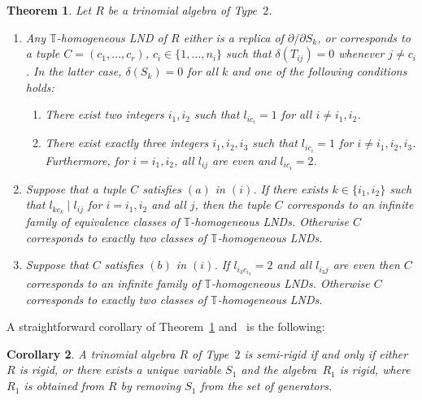 \documentclass[a4paper,reqno,12pt]{amsart}
\theoremstyle{plain}
\newtheorem{theorem}{Theorem}[section]
\newtheorem{corollary}[theorem]{Corollary}
\theoremstyle{definition}
\theoremstyle{plain}
\theoremstyle{remark}
\newcommand{\TT}{\mathbb{T}}
\begin{document}
\begin{theorem}\label{TheoremType2Classes}
    Let $R$ be a trinomial algebra of Type~$2$. 
    \begin{enumerate}
        \item [$(i)$] Any ${\TT}$-homogeneous LND of $R$ either is a replica of ${\partial/\partial S_k}$, or corresponds to a tuple $C=(c_1,\ldots,c_r)$, $c_i\in\{1,\ldots,n_i\}$ such that $\delta(T_{ij})=0$ whenever $j\neq c_i$. In the latter case, $\delta(S_k)=0$ for all $k$ and one of the following conditions holds:
        \begin{enumerate}
            \item [$(a)$] There exist two integers $i_1,i_2$ such that $l_{ic_i}=1$ for all $i\neq i_1, i_2$.
            \item [$(b)$] There exist exactly three integers $i_1, i_2, i_3$ such that $l_{ic_i}=1$ for $i\neq i_1, i_2, i_3$. Furthermore, for $i=i_1,i_2$, all $l_{ij}$ are even and $l_{ic_i}=2$.
        \end{enumerate}
        \item [$(ii)$] Suppose that a tuple $C$ satisfies $(a)$ in $(i)$. If there exists $k\in\{i_1, i_2\}$ such that $l_{kc_k}\mid l_{ij}$ for  $i=i_1, i_2$ and all $j$, then the tuple $C$ corresponds to an infinite family of equivalence classes of ${\TT}$-homogeneous LNDs. Otherwise $C$ corresponds to exactly two classes of ${\TT}$-homogeneous LNDs.
        \item [$(iii)$] Suppose that $C$ satisfies \emph{$(b)$} in \emph{$(i)$}. If $l_{i_3 c_{i_3}}=2$ and all $l_{i_3 j}$ are even then $C$ corresponds to an infinite family of ${\TT}$-homogeneous LNDs. Otherwise $C$ corresponds to exactly two classes of ${\TT}$-homogeneous LNDs.
    \end{enumerate}
\end{theorem}

A straightforward corollary of Theorem~\ref{TheoremType2Classes} %
and~\cite[Theorem~2.24]{Freu} is the following:
\begin{corollary}\label{CorSemiRigidType2}
    A trinomial algebra $R$ of Type~$2$ is semi-rigid if and only if either $R$ is rigid, or there exists a unique variable $S_1$ and the algebra~$R_1$ is rigid, where $R_1$ is obtained from $R$ by removing $S_1$ from the set of generators.
\end{corollary}
\end{document}
